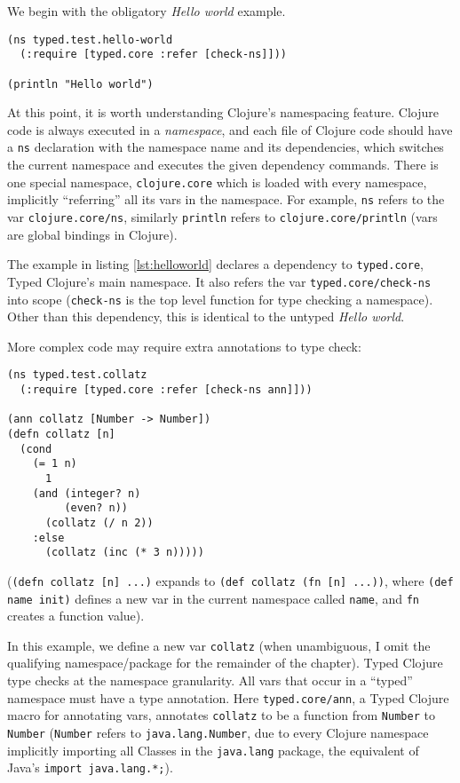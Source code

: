 We begin with the obligatory \emph{Hello world} example.

\begin{lstlisting}[caption=Typed Hello world, label=lst:helloworld]
(ns typed.test.hello-world
  (:require [typed.core :refer [check-ns]]))

(println "Hello world")
\end{lstlisting}

At this point, it is worth understanding Clojure's namespacing feature.
Clojure code is always executed in a \emph{namespace}, and each file of Clojure code should 
have a \lstinline|ns| declaration with the namespace name and its dependencies,
which switches the current namespace and executes the given dependency commands.
There is one special namespace, \lstinline|clojure.core| which is
loaded with every namespace, implicitly ``referring'' all its vars in the namespace.
For example, \lstinline|ns| refers to the var \lstinline|clojure.core/ns|,
similarly \lstinline|println| refers to \lstinline|clojure.core/println|
(vars are global bindings in Clojure).

The example in listing \ref{lst:helloworld} declares a dependency to 
\lstinline|typed.core|, Typed Clojure's main namespace. It also refers the var \lstinline|typed.core/check-ns|
into scope (\lstinline|check-ns| is the top level function for type checking a namespace).
Other than this dependency, this is identical to the untyped \emph{Hello world}.

More complex code may require extra annotations to type check:

\begin{lstlisting}[caption=Annotating vars in Typed Clojure (adapted from a Typed Scheme/Racket example by Tobin-Hochstadt~\cite{Tob10})]
(ns typed.test.collatz
  (:require [typed.core :refer [check-ns ann]]))

(ann collatz [Number -> Number])
(defn collatz [n]
  (cond
    (= 1 n) 
      1
    (and (integer? n) 
         (even? n)) 
      (collatz (/ n 2))
    :else 
      (collatz (inc (* 3 n)))))
\end{lstlisting}

(\lstinline|(defn collatz [n] ...)| expands to \lstinline|(def collatz (fn [n] ...))|,
where \lstinline|(def name init)| defines a new var in the current namespace 
called \lstinline|name|, and \lstinline|fn| creates a function value).

In this example, we define a new var \lstinline|collatz|
(when unambiguous, I omit the qualifying namespace/package for the remainder of the chapter).
Typed Clojure type checks at the namespace granularity. All vars that occur
in a ``typed'' namespace must have a type annotation. 
Here \lstinline|typed.core/ann|, a Typed Clojure macro for annotating vars, 
annotates \lstinline|collatz| to be a function from \lstinline|Number| to 
\lstinline|Number| (\lstinline|Number| refers to \lstinline|java.lang.Number|,
due to every Clojure namespace implicitly importing all Classes in the \lstinline|java.lang| package,
the equivalent of Java's \lstinline|import java.lang.*;|).

